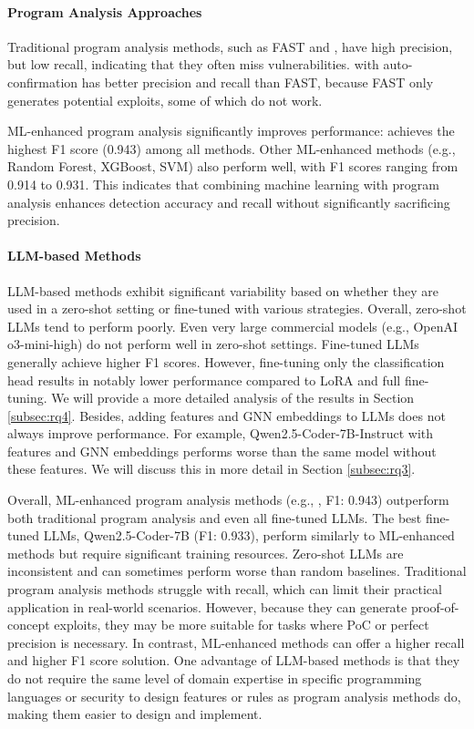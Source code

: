 \documentclass[12pt,openany,oneside,table]{cmuthesis}
\begin{document}
\paragraph{Program Analysis Approaches} 
Traditional program analysis methods, such as FAST and \nodemedicfine, have high precision, but low recall, 
indicating that they often miss vulnerabilities. \nodemedicfine with auto-confirmation has better precision and recall than FAST, because FAST only generates potential exploits, some of which do not work.


ML-enhanced program analysis significantly improves performance:
 achieves the highest F1 score (0.943) among all methods.
Other ML-enhanced methods (e.g., Random Forest, XGBoost, SVM) also perform well, with F1 scores ranging from 0.914 to 0.931.
This indicates that combining machine learning with program analysis enhances detection accuracy and recall without significantly sacrificing precision.

\paragraph{LLM-based Methods}
LLM-based methods exhibit significant variability based on whether they are used in a zero-shot setting or fine-tuned with various strategies. Overall, zero-shot LLMs tend to perform poorly. Even very large commercial models (e.g., OpenAI o3-mini-high) do not perform well in zero-shot settings. Fine-tuned LLMs generally achieve higher F1 scores. However, fine-tuning only the classification head results in notably lower performance compared to LoRA and full fine-tuning. We will provide a more detailed analysis of the results in Section \ref{subsec:rq4}. Besides, adding \nodemedicfine features and GNN embeddings to LLMs does not always improve performance. For example, Qwen2.5-Coder-7B-Instruct with \nodemedicfine features and GNN embeddings performs worse than the same model without these features. We will discuss this in more detail in Section \ref{subsec:rq3}. 

Overall, ML-enhanced program analysis methods (e.g., , F1: 0.943) outperform both traditional program analysis and even all fine-tuned LLMs. The best fine-tuned LLMs, Qwen2.5-Coder-7B (F1: 0.933), perform similarly to ML-enhanced methods but require significant training resources. Zero-shot LLMs are inconsistent and can sometimes perform worse than random baselines. Traditional program analysis methods struggle with recall, which can limit their practical application in real-world scenarios. However, because they can generate proof-of-concept exploits, they may be more suitable for tasks where PoC or perfect precision is necessary. In contrast, ML-enhanced methods can offer a higher recall and higher F1 score solution. 
 One advantage of LLM-based methods is that they do not require the same level of domain expertise in specific programming languages or security to design features or rules as program analysis methods do, making them easier to design and implement.
\end{document}
